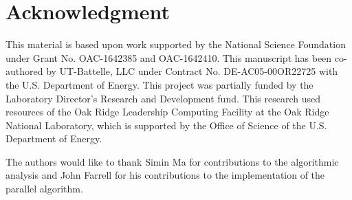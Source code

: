 
\section*{Acknowledgment}

This material is based upon work supported by the National Science Foundation under Grant No. OAC-1642385 and OAC-1642410.
This manuscript has been co-authored by UT-Battelle, LLC under Contract No. DE-AC05-00OR22725 with the U.S. Department of
Energy. This project was partially funded by the Laboratory Director's Research and Development fund. This research used resources
of the Oak Ridge Leadership Computing Facility at the Oak Ridge National Laboratory, which is supported by the Office of Science of
the U.S. Department of Energy.

The authors would like to thank Simin Ma for contributions to the algorithmic analysis and John Farrell for his contributions to the implementation of the parallel algorithm.
